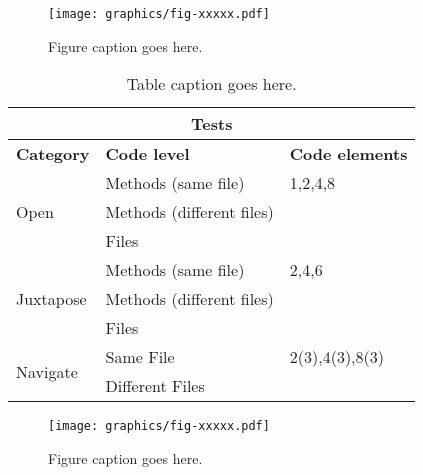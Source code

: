 %
%


%
%
\begin{figure}[t!]
\centering
\texttt{[image: graphics/fig-xxxxx.pdf]}
\caption{Figure caption goes here.}
\label{fig-xxxxx}
\end{figure}


%
%
\begin{table}[t!]
\centering
\caption{Table caption goes here.}
\label{tab-xxxxx}
\begin{tabular}{|l|l|l|} \hline
\multicolumn{3}{|c|}{\textbf{Tests}} \\ \hline
\textbf{Category}&\textbf{Code level}&\textbf{Code elements}\\ \hline
\multirow{3}{*}{Open} & Methods (same file) & 1,2,4,8 \\
& Methods (different files) &  \\
& Files &  \\ \hline
\multirow{3}{*}{Juxtapose} & Methods (same file) & 2,4,6 \\ 
& Methods (different files) &  \\ 
& Files &  \\ \hline
\multirow{2}{*}{Navigate} & Same File & 2(3),4(3),8(3) \\
& Different Files &  \\ \hline
\end{tabular}
\end{table}


%
%
\begin{figure*}
\centering
\texttt{[image: graphics/fig-xxxxx.pdf]}
\caption{Figure caption goes here.}
\label{fig-xxxxx}
\end{figure*}
